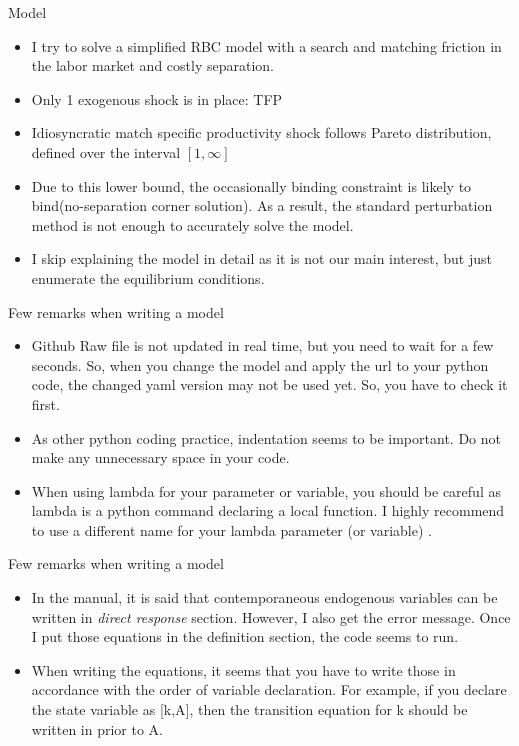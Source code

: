 \documentclass{beamer}
\begin{document}
\begin{frame}{Model}
    \begin{itemize}
        \item I try to solve a simplified RBC model with a search and matching friction in the labor market and costly separation. 
        \item Only 1 exogenous shock is in place: TFP
        \item Idiosyncratic match specific productivity shock follows Pareto distribution, defined over the interval $[1, \infty]$
        \item Due to this lower bound, the occasionally binding constraint is likely to bind(no-separation corner solution). As a result, the standard perturbation method is not enough to accurately solve the model.   
        \item I skip explaining the model in detail as it is not our main interest, but just enumerate the equilibrium conditions. 
    \end{itemize}
\end{frame}
\begin{frame}{Few remarks when writing a model}
    \begin{itemize}
        \item Github Raw file is not updated in real time, but you need to wait for a few seconds. So, when you change the model and apply the url to your python code, the changed yaml version may not be used yet. So, you have to check it first. 
        \item As other python coding practice, indentation seems to be important. Do not make any unnecessary space in your code. 
        \item When using lambda for your parameter or variable, you should be careful as lambda is a python command declaring a local function. I highly recommend  to use a different name for your lambda parameter (or variable) .  
        
    \end{itemize}

\end{frame}
\begin{frame}{Few remarks when writing a model}
    \begin{itemize}
       \item In the manual, it is said that contemporaneous endogenous variables can be written in \textit{direct response} section. However, I also get the error message. Once I put those equations in the definition section, the code seems to run. \item When writing the equations, it seems that you have to write those in accordance with the order of variable declaration. For example, if you declare the state variable as [k,A], then the transition equation for k should be written in prior to A.  
    \end{itemize}
\end{frame}
\end{document}
